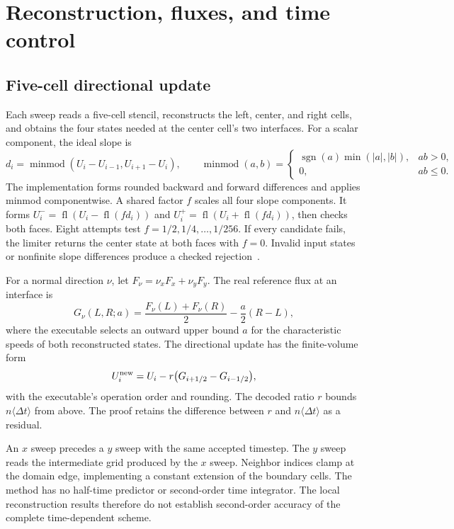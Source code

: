 \documentclass[11pt]{article}
\newcommand{\val}[1]{\langle #1\rangle}
\newcommand{\fl}{\operatorname{fl}}
\newcommand{\mm}{\operatorname{minmod}}
\begin{document}
\section{Reconstruction, fluxes, and time control}

\subsection{Five-cell directional update}

Each sweep reads a five-cell stencil, reconstructs the left, center, and right cells, and obtains the four states needed at the center cell's two interfaces.  For a scalar component, the ideal slope is
\begin{equation}
d_i=\mm(U_i-U_{i-1},U_{i+1}-U_i),\qquad
\mm(a,b)=\begin{cases}\operatorname{sgn}(a)\min(|a|,|b|),&ab>0,\\0,&ab\leq0.\end{cases}
\end{equation}
The implementation forms rounded backward and forward differences and applies minmod componentwise.  A shared factor $f$ scales all four slope components.  It forms $U_i^-=\fl(U_i-\fl(f d_i))$ and $U_i^+=\fl(U_i+\fl(f d_i))$, then checks both faces.  Eight attempts test $f=1/2,1/4,\ldots,1/256$.  If every candidate fails, the limiter returns the center state at both faces with $f=0$.  Invalid input states or nonfinite slope differences produce a checked rejection~\cite{reconstruction}.

For a normal direction $\nu$, let $F_\nu=\nu_xF_x+\nu_yF_y$.  The real reference flux at an interface is
\begin{equation}
G_\nu(L,R;a)=\frac{F_\nu(L)+F_\nu(R)}{2}-\frac a2(R-L),\label{eq:rusanov}
\end{equation}
where the executable selects an outward upper bound $a$ for the characteristic speeds of both reconstructed states.  The directional update has the finite-volume form
\begin{equation}
U_i^{\rm new}=U_i-r\bigl(G_{i+1/2}-G_{i-1/2}\bigr),\label{eq:update}
\end{equation}
with the executable's operation order and rounding.  The decoded ratio $r$ bounds $n\val{\Delta t}$ from above.  The proof retains the difference between $r$ and $n\val{\Delta t}$ as a residual.

An $x$ sweep precedes a $y$ sweep with the same accepted timestep.  The $y$ sweep reads the intermediate grid produced by the $x$ sweep.  Neighbor indices clamp at the domain edge, implementing a constant extension of the boundary cells.  The method has no half-time predictor or second-order time integrator.  The local reconstruction results therefore do not establish second-order accuracy of the complete time-dependent scheme.
\end{document}
